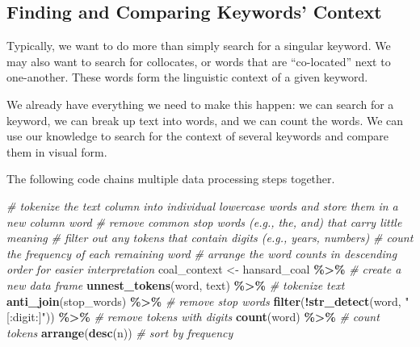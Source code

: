 \documentclass[
]{article}
\newenvironment{Shaded}{\begin{snugshade}}{\end{snugshade}}
\newcommand{\CommentTok}[1]{\textcolor[rgb]{0.56,0.35,0.01}{\textit{#1}}}
\newcommand{\FunctionTok}[1]{\textcolor[rgb]{0.13,0.29,0.53}{\textbf{#1}}}
\newcommand{\NormalTok}[1]{#1}
\newcommand{\OtherTok}[1]{\textcolor[rgb]{0.56,0.35,0.01}{#1}}
\newcommand{\SpecialCharTok}[1]{\textcolor[rgb]{0.81,0.36,0.00}{\textbf{#1}}}
\newcommand{\StringTok}[1]{\textcolor[rgb]{0.31,0.60,0.02}{#1}}
\begin{document}
\subsection{Finding and Comparing Keywords'
Context}\label{finding-and-comparing-keywords-context}

Typically, we want to do more than simply search for a singular keyword.
We may also want to search for collocates, or words that are
``co-located'' next to one-another. These words form the linguistic
context of a given keyword.

We already have everything we need to make this happen: we can search
for a keyword, we can break up text into words, and we can count the
words. We can use our knowledge to search for the context of several
keywords and compare them in visual form.

The following code chains multiple data processing steps together.

\begin{Shaded}
\begin{Highlighting}[]
\CommentTok{\# tokenize the \textquotesingle{}text\textquotesingle{} column into individual lowercase words and store them in a new column \textquotesingle{}word\textquotesingle{}}
\CommentTok{\# remove common stop words (e.g., \textquotesingle{}the\textquotesingle{}, \textquotesingle{}and\textquotesingle{}) that carry little meaning}
\CommentTok{\# filter out any tokens that contain digits (e.g., years, numbers)}
\CommentTok{\# count the frequency of each remaining word}
\CommentTok{\# arrange the word counts in descending order for easier interpretation}
\NormalTok{coal\_context }\OtherTok{\textless{}{-}}\NormalTok{ hansard\_coal }\SpecialCharTok{\%\textgreater{}\%} \CommentTok{\# create a new data frame }
  \FunctionTok{unnest\_tokens}\NormalTok{(word, text) }\SpecialCharTok{\%\textgreater{}\%} \CommentTok{\# tokenize text}
  \FunctionTok{anti\_join}\NormalTok{(stop\_words) }\SpecialCharTok{\%\textgreater{}\%} \CommentTok{\# remove stop words}
  \FunctionTok{filter}\NormalTok{(}\SpecialCharTok{!}\FunctionTok{str\_detect}\NormalTok{(word, }\StringTok{"[:digit:]"}\NormalTok{)) }\SpecialCharTok{\%\textgreater{}\%} \CommentTok{\# remove tokens with digits}
  \FunctionTok{count}\NormalTok{(word) }\SpecialCharTok{\%\textgreater{}\%} \CommentTok{\# count tokens}
  \FunctionTok{arrange}\NormalTok{(}\FunctionTok{desc}\NormalTok{(n)) }\CommentTok{\# sort by frequency}
\end{Highlighting}
\end{Shaded}
\end{document}
